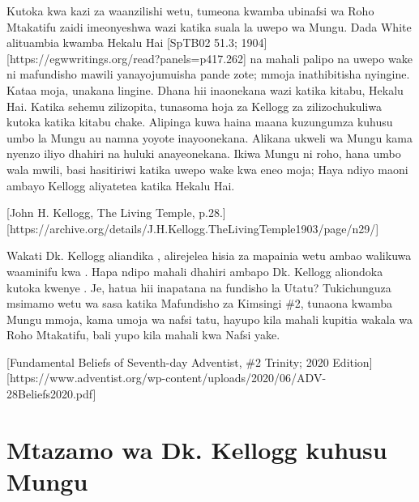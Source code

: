 Kutoka kwa kazi za waanzilishi wetu, tumeona kwamba ubinafsi wa Roho Mtakatifu zaidi imeonyeshwa wazi katika suala la uwepo wa Mungu. Dada White alituambia kwamba Hekalu Hai [SpTB02 51.3; 1904][https://egwwritings.org/read?panels=p417.262]  na mahali palipo na uwepo wake ni mafundisho mawili yanayojumuisha pande zote; mmoja inathibitisha nyingine. Kataa moja, unakana lingine. Dhana hii inaonekana wazi katika kitabu, Hekalu Hai. Katika sehemu zilizopita, tunasoma hoja za Kellogg za  zilizochukuliwa kutoka katika kitabu chake. Alipinga kuwa haina maana kuzungumza kuhusu umbo la Mungu au namna yoyote inayoonekana. Alikana ukweli wa Mungu kama nyenzo iliyo dhahiri na huluki anayeonekana. Ikiwa Mungu ni roho, hana umbo wala mwili, basi hasitiriwi katika uwepo wake kwa eneo moja; Haya ndiyo maoni ambayo Kellogg aliyatetea katika Hekalu Hai.

[John H. Kellogg, The Living Temple, p.28.][https://archive.org/details/J.H.Kellogg.TheLivingTemple1903/page/n29/]

Wakati Dk. Kellogg aliandika , alirejelea hisia za mapainia wetu ambao walikuwa waaminifu kwa . Hapa ndipo mahali dhahiri ambapo Dk. Kellogg aliondoka kutoka kwenye . Je, hatua hii inapatana na fundisho la Utatu? Tukichunguza msimamo wetu wa sasa katika Mafundisho za Kimsingi \#2, tunaona kwamba Mungu mmoja, kama umoja wa nafsi tatu, hayupo kila mahali kupitia wakala wa Roho Mtakatifu, bali yupo kila mahali kwa Nafsi yake.

[Fundamental Beliefs of Seventh-day Adventist, \#2 Trinity; 2020 Edition][https://www.adventist.org/wp-content/uploads/2020/06/ADV-28Beliefs2020.pdf]

\section*{Mtazamo wa Dk. Kellogg kuhusu Mungu}

